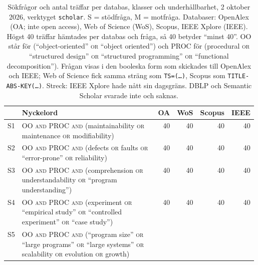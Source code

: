 \begin{table}[!b]
  \centering
  \caption{Sökfrågor och antal träffar per databas, klasser och
    underhållbarhet, 2 oktober 2026, verktyget \texttt{scholar}.
    S = stödfråga, M = motfråga.  Databaser: OpenAlex (OA; inte
    \foreignlanguage{english}{open access}), Web of Science (WoS),
    Scopus, IEEE Xplore (IEEE).  Högst 40 träffar hämtades per databas
    och fråga, så 40 betyder \enquote{minst 40}.  OO står för
    (\enquote{object-oriented} \textsc{or} \enquote{object oriented}) och
    PROC för (procedural \textsc{or} \enquote{structured design}
    \textsc{or} \enquote{structured programming} \textsc{or}
    \enquote{functional decomposition}).  Frågan visas i den booleska
    form som skickades till OpenAlex och IEEE; Web of Science fick samma
    sträng som \texttt{TS=(\dots)}, Scopus som
    \texttt{TITLE-ABS-KEY(\dots)}.  Streck: IEEE Xplore hade nått sin
    dagsgräns.  DBLP och Semantic Scholar svarade inte och saknas.}
  \label{tab:sok-queries-underhall}
  \scriptsize
  \begin{tabular}{@{}lp{0.58\linewidth}rrrr@{}}
    \toprule
    & Nyckelord & OA & WoS & Scopus & IEEE \\
    \midrule
    S1 & OO \textsc{and} PROC \textsc{and} (maintainability \textsc{or} maintenance \textsc{or} modifiability)
       & 40 & 40 & 40 & 40 \\
    S2 & OO \textsc{and} PROC \textsc{and} (defects \textsc{or} faults \textsc{or} \enquote{error-prone} \textsc{or} reliability)
       & 40 & 40 & 40 & 40 \\
    S3 & OO \textsc{and} PROC \textsc{and} (comprehension \textsc{or} understandability \textsc{or} \enquote{program understanding})
       & 40 & 40 & 40 & 40 \\
    S4 & OO \textsc{and} PROC \textsc{and} (experiment \textsc{or} \enquote{empirical study} \textsc{or} \enquote{controlled experiment} \textsc{or} \enquote{case study})
       & 40 & 40 & 40 & 40 \\
    S5 & OO \textsc{and} PROC \textsc{and} (\enquote{program size} \textsc{or} \enquote{large programs} \textsc{or} \enquote{large systems} \textsc{or} scalability \textsc{or} evolution \textsc{or} growth)

\end{tabular}
\end{table}
